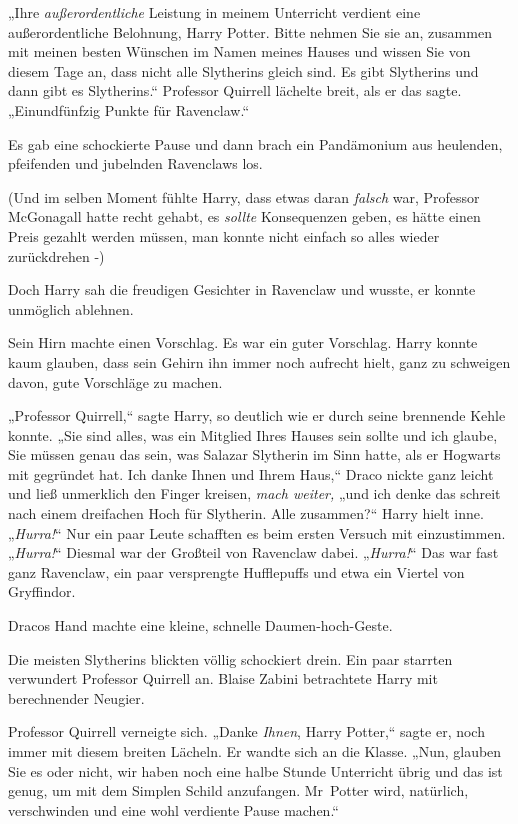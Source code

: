 {„Ihre \emph{außerordentliche} Leistung in meinem Unterricht verdient eine außerordentliche Belohnung, Harry Potter. Bitte nehmen Sie sie an, zusammen mit meinen besten Wünschen im Namen meines Hauses und wissen Sie von diesem Tage an, dass nicht alle Slytherins gleich sind. Es gibt Slytherins und dann gibt es Slytherins.“ Professor Quirrell lächelte breit, als er das sagte. „Einundfünfzig Punkte für Ravenclaw.“

Es gab eine schockierte Pause und dann brach ein Pandämonium aus heulenden, pfeifenden und jubelnden Ravenclaws los.

(Und im selben Moment fühlte Harry, dass etwas daran \emph{falsch} war, Professor McGonagall hatte recht gehabt, es \emph{sollte} Konsequenzen geben, es hätte einen Preis gezahlt werden müssen, man konnte nicht einfach so alles wieder zurückdrehen -)

Doch Harry sah die freudigen Gesichter in Ravenclaw und wusste, er konnte unmöglich ablehnen.

Sein Hirn machte einen Vorschlag. Es war ein guter Vorschlag. Harry konnte kaum glauben, dass sein Gehirn ihn immer noch aufrecht hielt, ganz zu schweigen davon, gute Vorschläge zu machen.

„Professor Quirrell,“ sagte Harry, so deutlich wie er durch seine brennende Kehle konnte. „Sie sind alles, was ein Mitglied Ihres Hauses sein sollte und ich glaube, Sie müssen genau das sein, was Salazar Slytherin im Sinn hatte, als er Hogwarts mit gegründet hat. Ich danke Ihnen und Ihrem Haus,“ Draco nickte ganz leicht und ließ unmerklich den Finger kreisen, \emph{mach weiter,} „und ich denke das schreit nach einem dreifachen Hoch für Slytherin. Alle zusammen?“ Harry hielt inne. „\emph{Hurra!}“ Nur ein paar Leute schafften es beim ersten Versuch mit einzustimmen. „\emph{Hurra!}“ Diesmal war der Großteil von Ravenclaw dabei. „\emph{Hurra!}“ Das war fast ganz Ravenclaw, ein paar versprengte Hufflepuffs und etwa ein Viertel von Gryffindor.

Dracos Hand machte eine kleine, schnelle Daumen-hoch-Geste.

Die meisten Slytherins blickten völlig schockiert drein. Ein paar starrten verwundert Professor Quirrell an. Blaise Zabini betrachtete Harry mit berechnender Neugier.

Professor Quirrell verneigte sich. „Danke \emph{Ihnen}, Harry Potter,“ sagte er, noch immer mit diesem breiten Lächeln. Er wandte sich an die Klasse. „Nun, glauben Sie es oder nicht, wir haben noch eine halbe Stunde Unterricht übrig und das ist genug, um mit dem Simplen Schild anzufangen. Mr~Potter wird, natürlich, verschwinden und eine wohl verdiente Pause machen.“

}
